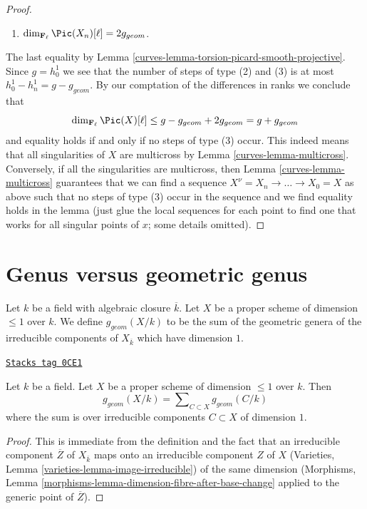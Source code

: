 \begin{proof}
\begin{enumerate}
\item $\dim_{\mathbf{F}_\ell} \Pic(X_n)[\ell] = 2g_{geom}$.
\end{enumerate}
The last equality by Lemma \ref{curves-lemma-torsion-picard-smooth-projective}.
Since $g = h^1_0$ we see that the number of steps of type
(2) and (3) is at most $h^1_0 - h^1_n = g - g_{geom}$.
By our comptation of the differences in ranks we conclude that
$$
\dim_{\mathbf{F}_\ell} \Pic(X)[\ell] \leq
g - g_{geom} + 2g_{geom} = g + g_{geom}
$$
and equality holds if and only if no steps of type (3) occur.
This indeed means that all singularities of $X$ are multicross
by Lemma \ref{curves-lemma-multicross}. Conversely, if all the singularities
are multicross, then Lemma \ref{curves-lemma-multicross} guarantees that
we can find a sequence $X^\nu = X_n \to \ldots \to X_0 = X$
as above such that no steps of type (3) occur in the sequence
and we find equality holds in the lemma (just glue the local sequences
for each point to find one that works for all singular points of $x$;
some details omitted).
\end{proof}

\section{Genus versus geometric genus}
\label{curves-section-genus-geometric-genus}
Let $k$ be a field with algebraic closure $\overline{k}$.
Let $X$ be a proper scheme of dimension $\leq 1$ over $k$.
We define $g_{geom}(X/k)$ to be the sum of the geometric genera
of the irreducible components of $X_{\overline{k}}$ which have dimension $1$.

\begin{lemma}
\label{curves-lemma-bound-geometric-genus}
\href{https://stacks.math.columbia.edu/tag/0CE1}{\texttt{Stacks tag 0CE1}}

Let $k$ be a field. Let $X$ be a proper scheme of dimension $\leq 1$ over $k$.
Then
$$
g_{geom}(X/k) = \sum\nolimits_{C \subset X} g_{geom}(C/k)
$$
where the sum is over irreducible components $C \subset X$ of dimension $1$.
\end{lemma}

\begin{proof}
This is immediate from the definition and the fact that an irreducible
component $\overline{Z}$ of $X_{\overline{k}}$ maps onto an
irreducible component $Z$ of $X$
(Varieties, Lemma \ref{varieties-lemma-image-irreducible})
of the same dimension
(Morphisms, Lemma \ref{morphisms-lemma-dimension-fibre-after-base-change}
applied to the generic point of $\overline{Z}$).
\end{proof}

